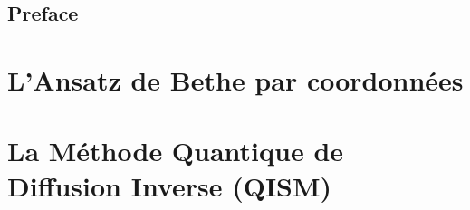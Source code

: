 



\makeatletter







\maketitle\\





\tableofcontents




\newpage


                
\chapter*{Preface}           


\part{L'Ansatz de Bethe par coordonnées}
%

\part{La Méthode Quantique de Diffusion Inverse (QISM)}






			            
